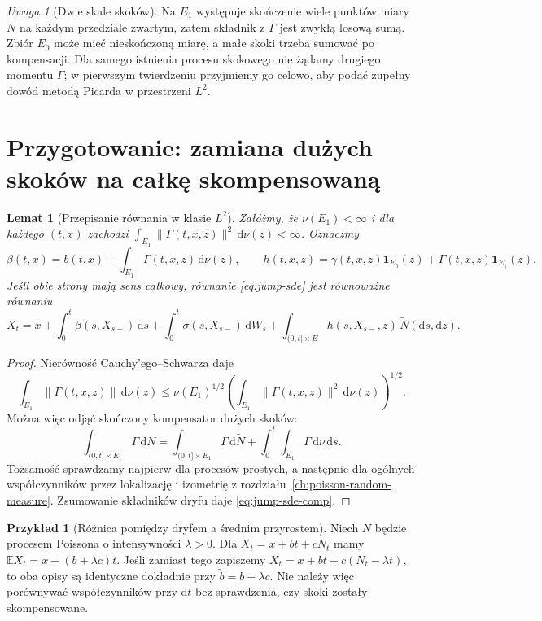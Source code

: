 \documentclass[11pt,a4paper,oneside]{report}
\numberwithin{equation}{chapter}
\theoremstyle{plain}
\newtheorem{lemat}[twierdzenie]{Lemat}
\theoremstyle{definition}
\newtheorem{przyklad}{Przykład}[chapter]
\theoremstyle{remark}
\newtheorem{uwaga}{Uwaga}[chapter]
\newcommand{\E}{\mathbb{E}}
\newcommand{\ind}[1]{\mathbf{1}_{#1}}
\newcommand{\dd}{\mathrm{d}}
\begin{document}
\begin{uwaga}[Dwie skale skoków]
Na $E_1$ występuje skończenie wiele punktów miary $N$ na każdym
przedziale zwartym, zatem składnik z $\Gamma$ jest zwykłą losową
sumą. Zbiór $E_0$ może mieć nieskończoną miarę, a małe skoki
trzeba sumować po kompensacji. Dla samego istnienia procesu
skokowego nie żądamy drugiego momentu $\Gamma$; w pierwszym
twierdzeniu przyjmiemy go celowo, aby podać zupełny dowód
metodą Picarda w przestrzeni $L^2$.
\end{uwaga}

\section{Przygotowanie: zamiana dużych skoków na całkę skompensowaną}

\begin{lemat}[Przepisanie równania w klasie $L^2$]
\label{lem:rewrite-jump-sde}
Załóżmy, że $\nu(E_1)<\infty$ i dla każdego $(t,x)$ zachodzi
$\int_{E_1}\|\Gamma(t,x,z)\|^2\,\dd\nu(z)<\infty$.
Oznaczmy
\[
 \beta(t,x)=b(t,x)+\int_{E_1}\Gamma(t,x,z)\,\dd\nu(z),\qquad
 h(t,x,z)=\gamma(t,x,z)\ind{E_0}(z)+\Gamma(t,x,z)\ind{E_1}(z).
\]
Jeśli obie strony mają sens całkowy, równanie
\eqref{eq:jump-sde} jest równoważne równaniu
\[
 X_t=x+\int_0^t\beta(s,X_{s-})\,\dd s
 +\int_0^t\sigma(s,X_{s-})\,\dd W_s
 +\int_{(0,t]\times E}h(s,X_{s-},z)\,\widetilde N(\dd s,\dd z).
 \tag{13.2}\label{eq:jump-sde-comp}
\]
\end{lemat}
\begin{proof}
Nierówność Cauchy'ego--Schwarza daje
\[
\int_{E_1}\|\Gamma(t,x,z)\|\,\dd\nu(z)
\le \nu(E_1)^{1/2}
\left(\int_{E_1}\|\Gamma(t,x,z)\|^2\,\dd\nu(z)\right)^{1/2}.
\]
Można więc odjąć skończony kompensator dużych skoków:
\[
\int_{(0,t]\times E_1}\Gamma\,\dd N
=\int_{(0,t]\times E_1}\Gamma\,\dd\widetilde N
 +\int_0^t\int_{E_1}\Gamma\,\dd\nu\,\dd s.
\]
Tożsamość sprawdzamy najpierw dla procesów prostych,
a następnie dla ogólnych współczynników przez lokalizację
i izometrię z rozdziału~\ref{ch:poisson-random-measure}.
Zsumowanie składników dryfu daje \eqref{eq:jump-sde-comp}.
\end{proof}

\begin{przyklad}[Różnica pomiędzy dryfem a średnim przyrostem]
Niech $N$ będzie procesem Poissona o intensywności
$\lambda>0$. Dla $X_t=x+bt+cN_t$ mamy
$\E X_t=x+(b+\lambda c)t$. Jeśli zamiast tego zapiszemy
$X_t=x+\widetilde b t+c(N_t-\lambda t)$, to oba opisy
są identyczne dokładnie przy $\widetilde b=b+\lambda c$.
Nie należy więc porównywać współczynników przy $\dd t$ bez
sprawdzenia, czy skoki zostały skompensowane.
\end{przyklad}
\end{document}
